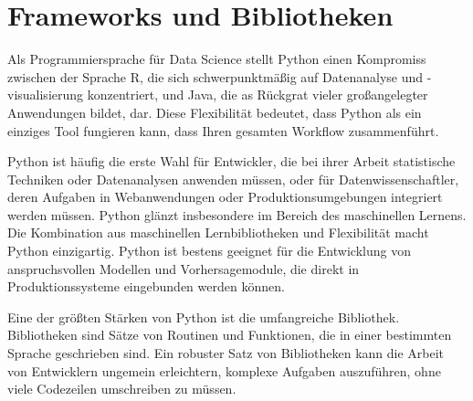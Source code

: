 %
%




\chapter{Frameworks und Bibliotheken}




Als Programmiersprache für Data Science stellt Python einen Kompromiss zwischen der Sprache R, die sich schwerpunktmäßig auf Datenanalyse und -visualisierung konzentriert, und Java, die as Rückgrat vieler großangelegter Anwendungen bildet, dar. Diese Flexibilität bedeutet, dass Python als ein einziges Tool fungieren kann, dass Ihren gesamten Workflow zusammenführt.

Python ist häufig die erste Wahl für Entwickler, die bei ihrer Arbeit statistische Techniken oder Datenanalysen anwenden müssen, oder für Datenwissenschaftler, deren Aufgaben in Webanwendungen oder Produktionsumgebungen integriert werden müssen. Python glänzt insbesondere im Bereich des maschinellen Lernens. Die Kombination aus maschinellen Lernbibliotheken und Flexibilität macht Python einzigartig. Python ist bestens geeignet für die Entwicklung von anspruchsvollen Modellen und Vorhersagemodule, die direkt in Produktionssysteme eingebunden werden können.

Eine der größten Stärken von Python ist die umfangreiche Bibliothek. Bibliotheken sind Sätze von Routinen und Funktionen, die in einer bestimmten Sprache geschrieben sind. Ein robuster Satz von Bibliotheken kann die Arbeit von Entwicklern ungemein erleichtern, komplexe Aufgaben auszuführen, ohne viele Codezeilen umschreiben zu müssen. 



